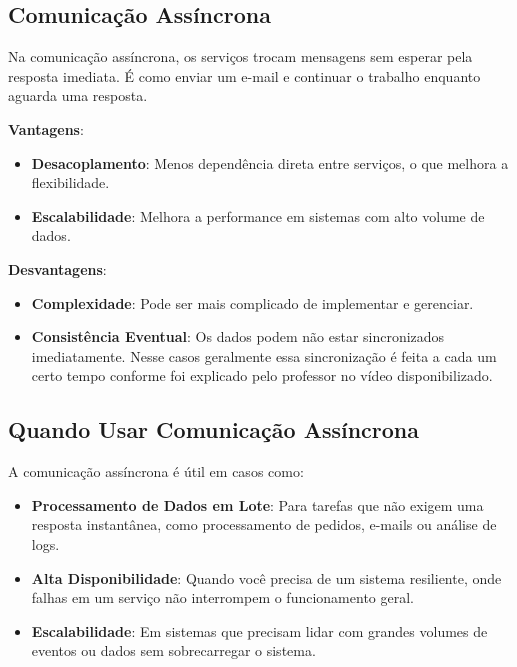 \documentclass{article}
\begin{document}
	\subsection*{Comunicação Assíncrona}
	
	Na comunicação assíncrona, os serviços trocam mensagens sem esperar pela resposta imediata. É como enviar um e-mail e continuar o trabalho enquanto aguarda uma resposta.
	
	\textbf{Vantagens}:
	\begin{itemize}
		\item \textbf{Desacoplamento}: Menos dependência direta entre serviços, o que melhora a flexibilidade.
		\item \textbf{Escalabilidade}: Melhora a performance em sistemas com alto volume de dados.
	\end{itemize}
	
	\textbf{Desvantagens}:
	\begin{itemize}
		\item \textbf{Complexidade}: Pode ser mais complicado de implementar e gerenciar.
		\item \textbf{Consistência Eventual}: Os dados podem não estar sincronizados imediatamente. Nesse casos geralmente essa sincronização é feita a cada um certo tempo conforme foi explicado pelo professor no vídeo disponibilizado.
	\end{itemize}
	
	\subsection*{Quando Usar Comunicação Assíncrona}
	
	A comunicação assíncrona é útil em casos como:
	
	\begin{itemize}
		\item \textbf{Processamento de Dados em Lote}: Para tarefas que não exigem uma resposta instantânea, como processamento de pedidos, e-mails ou análise de logs.
		\item \textbf{Alta Disponibilidade}: Quando você precisa de um sistema resiliente, onde falhas em um serviço não interrompem o funcionamento geral.
		\item \textbf{Escalabilidade}: Em sistemas que precisam lidar com grandes volumes de eventos ou dados sem sobrecarregar o sistema.
	\end{itemize}
	

	\vspace{1cm}
	
\end{document}

